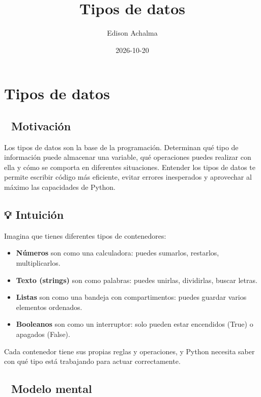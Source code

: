 \documentclass[
  doc,
  floatsintext,
  longtable,
  a4paper,
  nolmodern,
  notxfonts,
  notimes,
  12pt,
  colorlinks=true,linkcolor=blue,citecolor=blue,urlcolor=blue]{apa7}
\title{Tipos de datos}
\author{Edison Achalma}
\affiliation{
{Escuela Profesional de Economía, Universidad Nacional de San Cristóbal
de Huamanga}}
\date{2026-10-20}
\providecommand{\tightlist}{%
  \setlength{\itemsep}{0pt}\setlength{\parskip}{0pt}}
\begin{document}
\maketitle


\hypertarget{toc}{}
\tableofcontents
\newpage
\section[Introduction]{Tipos de datos}

\setcounter{secnumdepth}{3}

\setlength\LTleft{0pt}




\subsection{🎯 Motivación}\label{motivaciuxf3n}

Los tipos de datos son la base de la programación. Determinan qué tipo
de información puede almacenar una variable, qué operaciones puedes
realizar con ella y cómo se comporta en diferentes situaciones. Entender
los tipos de datos te permite escribir código más eficiente, evitar
errores inesperados y aprovechar al máximo las capacidades de Python.

\subsection{💡 Intuición}\label{intuiciuxf3n}

Imagina que tienes diferentes tipos de contenedores:

\begin{itemize}
\tightlist
\item
  \textbf{Números} son como una calculadora: puedes sumarlos, restarlos,
  multiplicarlos.
\item
  \textbf{Texto (strings)} son como palabras: puedes unirlas,
  dividirlas, buscar letras.
\item
  \textbf{Listas} son como una bandeja con compartimentos: puedes
  guardar varios elementos ordenados.
\item
  \textbf{Booleanos} son como un interruptor: solo pueden estar
  encendidos (True) o apagados (False).
\end{itemize}

Cada contenedor tiene sus propias reglas y operaciones, y Python
necesita saber con qué tipo está trabajando para actuar correctamente.

\subsection{🧠 Modelo mental}\label{modelo-mental}
\end{document}
